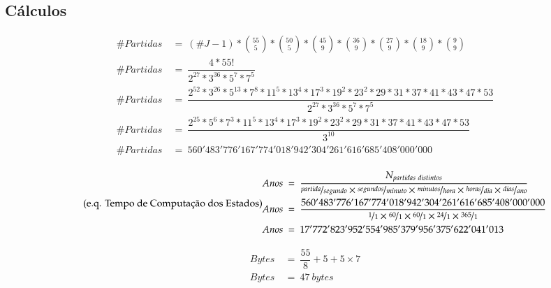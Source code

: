 \subsection{Cálculos}\label{cuxe1lculos}

\begin{equation} \label{eq_partidas} \tag{e.q. Números de Partidas Distintas}
\begin{split}
\#Partidas\ &=\  (\#J-1) * \binom{55}{5} * \binom{50}{5} * \binom{45}{9} * \binom{36}{9} * \binom{27}{9} * \binom{18}{9} * \binom{9}{9}\\
\#Partidas\ &=\ \dfrac{4 * 55!}{2^{27} * 3^{36} * 5^7 * 7^5}\\
\#Partidas\ &=\ \dfrac{2^{52} * 3^{26} * 5^{13} * 7^{8} * 11^{5} * 13^{4} * 17^{3} * 19^{2} * 23^{2} * 29 * 31 * 37 * 41 * 43 * 47 * 53}{2^{27} * 3^{36} * 5^7 * 7^5}\\
\#Partidas\ &=\ \dfrac{2^{25} * 5^{6} * 7^{3} * 11^{5} * 13^{4} * 17^{3} * 19^{2} * 23^{2} * 29 * 31 * 37 * 41 * 43 * 47 * 53}{3^{10}}\\
\#Partidas\ &=\ 560'483'776'167'774'018'942'304'261'616'685'408'000'000\\
\end{split}
\end{equation}

\begin{equation} \label{eq_anos_partidas} \tag{e.q. Tempo de Computação dos Estados}
\begin{split}
Anos\ &=\ \dfrac{N_{partidas\ distintos}}{\nicefrac{partida}{segundo}\times\nicefrac{segundos}{minuto}\times\nicefrac{minutos}{hora}\times\nicefrac{horas}{dia}\times\nicefrac{dias}{ano}}\\
Anos\ &=\ \dfrac{560'483'776'167'774'018'942'304'261'616'685'408'000'000}{\nicefrac{1}{1}\times\nicefrac{60}{1}\times\nicefrac{60}{1}\times\nicefrac{24}{1}\times\nicefrac{365}{1}}\\
Anos\ &=\ 17'772'823'952'554'985'379'956'375'622'041'013\\
\end{split}
\end{equation}

\begin{equation} \label{eq_bytes} \tag{e.q. Bytes na memória}
\begin{split}
Bytes\ &=\ \dfrac{55}{8} + 5 + 5\times 7\\
Bytes\ &=\ 47\ bytes
\end{split}
\end{equation}

